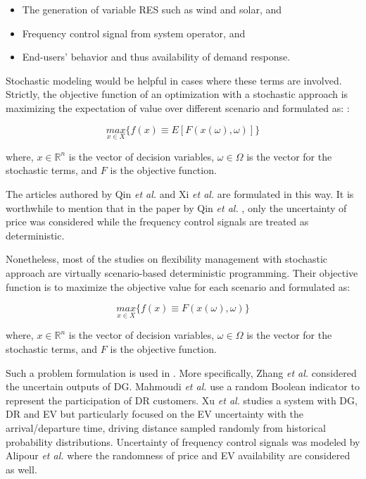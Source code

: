 \begin{itemize}
	\item The generation of variable RES such as wind and solar, and
	\item Frequency control signal from system operator, and
	\item End-users' behavior and thus availability of demand response.
\end{itemize}

Stochastic modeling would be helpful in cases where these terms are involved. Strictly, the objective function of an optimization with a stochastic approach is maximizing the expectation of value over different scenario and formulated as:  \cite{Zucker2013}:

\begin{equation*}
	\underset{x\in X}{max}\{ f(x) \equiv E[F(x(\omega),\omega) ] \}
\end{equation*}
 
where, $x \in \mathbb{R}^n$ is the vector of decision variables, $\omega \in  \Omega$ is the vector for the stochastic terms, and $F$ is the objective function. 

The articles authored by Qin \textit{et al.} \cite{Qin2012} and Xi \textit{et al.} \cite{Xi2014} are formulated in this way. It is worthwhile to mention that in the paper by Qin \textit{et al.} \cite{Qin2012}, only the uncertainty of price was considered while the frequency control signals are treated as deterministic. 

Nonetheless, most of the studies on flexibility management with stochastic approach are virtually scenario-based deterministic programming. Their objective function is to maximize the objective value for each scenario and formulated as:

\begin{equation*}
\underset{x\in X}{max}\{ f(x) \equiv F(x(\omega),\omega)\}
\end{equation*}

where, $x \in \mathbb{R}^n$ is the vector of decision variables, $\omega \in  \Omega$ is the vector for the stochastic terms, and $F$ is the objective function. 

Such a problem formulation is used in \cite{Zhang2016,Alipour2017,Mahmoudi2017,Xu2017,Han2017,Calvillo2016,Mahmoudi2014}. More specifically, Zhang \textit{et al.} \cite{Zhang2016} considered the uncertain outputs of DG. Mahmoudi \textit{et al.} \cite{Mahmoudi2017} use a random Boolean indicator to represent the participation of DR customers. Xu \textit{et al.} \cite{Xu2017} studies a system with DG, DR and EV but particularly focused on the EV uncertainty with the arrival/departure time, driving distance sampled randomly from historical probability distributions. Uncertainty of frequency control signals was modeled by Alipour \textit{et al.} \cite{Alipour2017} where the randomness of price and EV availability are considered as well. 

